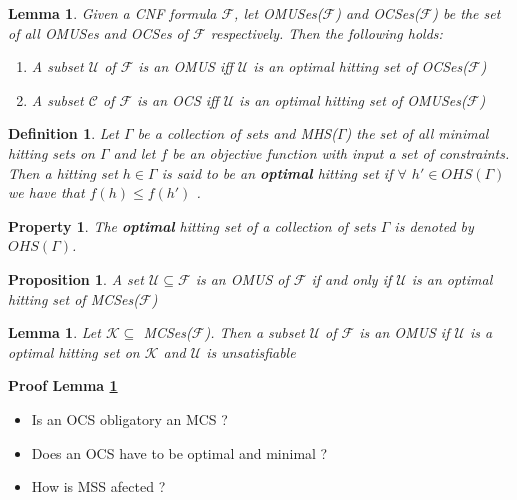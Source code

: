 \documentclass{article}
\newcommand\m[1]{\mathcal{#1}}
\newtheorem{definition}[thm]{Definition}
\newtheorem{property}[prop]{Property}
\newtheorem{lemma}[lem]{Lemma}
\newtheorem{proposition}[propo]{Proposition}
\newcommand\comment[1]{\marginpar{\tiny #1}}
\renewcommand\comment[1]{#1}
\newcommand{\emilio}[1]{{\comment{\color{red}#1}}}
\begin{document}

\begin{lemma}
  Given a CNF formula $\m{F}$, let OMUSes($\m{F}$) and OCSes($\m{F}$) be the set of all OMUSes and OCSes of $\m{F}$ respectively. Then the following holds:
  \begin{enumerate}
    \item A subset $\m{U}$ of $\m{F}$ is an OMUS iff $\m{U}$ is an optimal hitting set of OCSes($\m{F}$)
    \item A subset $\m{C}$ of $\m{F}$ is an OCS iff $\m{U}$ is an optimal hitting set of OMUSes($\m{F}$)
  \end{enumerate}
\end{lemma}


\begin{definition}
  Let $\Gamma$ be a collection of sets and MHS($\Gamma$) the set of all minimal hitting sets on $\Gamma$ and let $f$ be an objective function with input a set of constraints. Then a hitting set $ h \in \Gamma$ is said to be an \textbf{optimal} hitting set if $\forall$ $h' \in OHS(\Gamma)$ we have that %
  $f(h) \leq f(h')$ \cite{davies2011solving}.
\end{definition}

\begin{property}
  The \textbf{optimal} hitting set of a collection of sets $\Gamma$ is denoted by $OHS(\Gamma)$.
\end{property}


\begin{proposition}
  A set $\m{U} \subseteq \m{F}$ is an OMUS of $\m{F}$ if and only if $\m{U}$ is an optimal hitting set of MCSes($\m{F}$)
\end{proposition}

\begin{lemma}\label{lemma:K}
  Let $\m{K}  \subseteq$ MCSes($\m{F}$). Then a subset $\m{U}$ of $\m{F}$ is an OMUS if $\m{U}$ is a optimal hitting set on $\m{K}$ and $\m{U}$ is unsatisfiable
\end{lemma}

\textbf{Proof Lemma \ref{lemma:K}}


\begin{itemize}
  \item \emilio{Is an OCS obligatory an MCS ?}
  \item \emilio{Does an OCS have to be optimal and minimal ? }
  \item \emilio{How is MSS afected ?}
\end{itemize}
\end{document}
